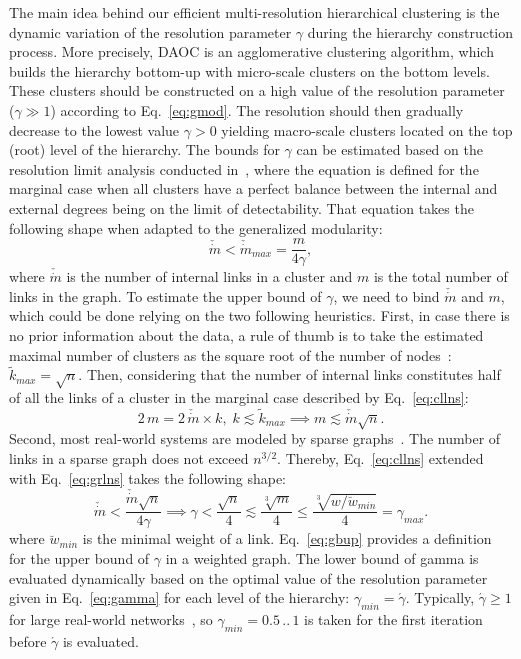 \documentclass[conference]{IEEEtran}
\begin{document}
The main idea behind our efficient multi-resolution hierarchical clustering is the dynamic variation of the resolution parameter $\gamma$ during the hierarchy construction process. More precisely, DAOC is an agglomerative clustering algorithm, which builds the hierarchy bottom-up
with micro-scale clusters on the bottom levels. These clusters should be constructed on a high value of the resolution parameter ($\gamma \gg 1$) according to Eq.~\eqref{eq:gmod}. The resolution should then gradually decrease to the lowest value $\gamma > 0$ yielding macro-scale clusters located on the top (root) level of the hierarchy.
The bounds for $\gamma$ can be estimated based on the resolution limit analysis conducted in~\cite{Fort07}, where the equation is defined
for the marginal case when all clusters have a perfect balance between the internal and external degrees being on the limit of detectability. That equation takes the following shape when adapted to the generalized modularity:
\begin{equation}  \check{\dot{m}} < \check{\dot{m}}_{max} = \frac{m}{4 \gamma},
\label{eq:cllns}
\end{equation}
where $\check{\dot{m}}$ is the number of internal links in a cluster and $m$ is the total number of links in the graph. To estimate the upper bound of $\gamma$, we need to bind $\check{\dot{m}}$ and $m$, which could be done relying on the two following heuristics. First, in case there is no prior information about the data, a rule of thumb is to take the estimated maximal number of clusters as the square root of the number of nodes~\cite{Mard79}: $\tilde{k}_{max} = \sqrt{n}$. Then, considering that the number of internal links constitutes half of all the links of a cluster in the marginal case described by Eq.~\eqref{eq:cllns}:
\begin{equation}
2\,m = 2\,\check{\dot{m}} \times k,\; k \lesssim \tilde{k}_{max} \implies m \lesssim \check{\dot{m}} \sqrt{n}.
\label{eq:grlns}
\end{equation}
Second, most real-world systems are modeled by sparse graphs~\cite{Bara16}. The number of links in a sparse graph does not exceed $n^{3/2}$. Thereby, Eq.~\eqref{eq:cllns} extended with Eq.~\eqref{eq:grlns} takes the following shape:
\begin{equation}  \check{\dot{m}} < \frac{\check{\dot{m}} \sqrt{n}}{4 \gamma} \implies
\gamma < \frac{\sqrt{n}}{4} \lesssim \frac{\sqrt[3]{m}}{4} \le \frac{\sqrt[3]{w/\breve{w}_{min}}}{4} = \gamma_{max}.
\label{eq:gbup}
\end{equation}
where $\breve{w}_{min}$ is the minimal weight of a link. Eq.~\eqref{eq:gbup} provides a definition for the upper bound of $\gamma$ in a weighted graph.
The lower bound of gamma is evaluated dynamically based on the optimal value of the resolution parameter given in Eq.~\eqref{eq:gamma} for each level of the hierarchy: $\gamma_{min} = \acute{\gamma}$.
Typically, $\acute{\gamma} \ge 1$ for large real-world networks~\cite{Newm16}, so $\gamma_{min} = 0.5\, .. \,1$ is taken for the first iteration before $\acute{\gamma}$ is evaluated. 
\end{document}
